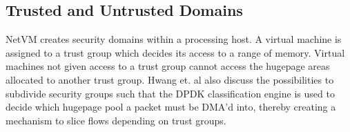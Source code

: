 \subsection*{Trusted and Untrusted Domains}
NetVM creates security domains within a processing host. A virtual machine is assigned to a trust group which decides its access to a range of memory. Virtual machines not given access to a trust group cannot access the hugepage areas allocated to another trust group. Hwang et. al also discuss the possibilities to subdivide security groups such that the DPDK classification engine is used to decide which hugepage pool a packet must be DMA'd into, thereby creating a mechanism to slice flows depending on trust groups.
